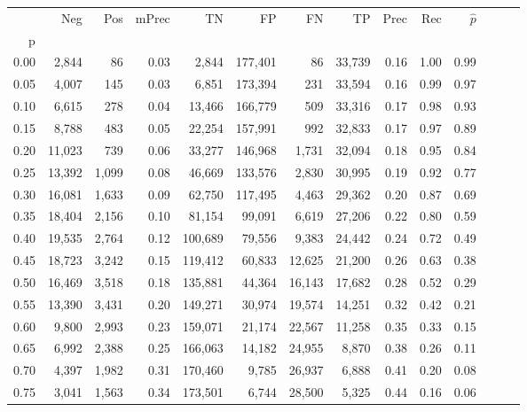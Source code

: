 \begin{tabular}{rrrrrrrrrrrrrr}
\toprule
{} &     Neg &    Pos & mPrec &       TN &       FP &      FN &      TP &  Prec &   Rec & $\hat{p}$ \\
p    &         &        &       &          &          &         &         &       &       &           \\
\midrule
0.00 &   2,844 &     86 &  0.03 &    2,844 &  177,401 &      86 &  33,739 &  0.16 &  1.00 &      0.99 \\
0.05 &   4,007 &    145 &  0.03 &    6,851 &  173,394 &     231 &  33,594 &  0.16 &  0.99 &      0.97 \\
0.10 &   6,615 &    278 &  0.04 &   13,466 &  166,779 &     509 &  33,316 &  0.17 &  0.98 &      0.93 \\
0.15 &   8,788 &    483 &  0.05 &   22,254 &  157,991 &     992 &  32,833 &  0.17 &  0.97 &      0.89 \\
0.20 &  11,023 &    739 &  0.06 &   33,277 &  146,968 &   1,731 &  32,094 &  0.18 &  0.95 &      0.84 \\
0.25 &  13,392 &  1,099 &  0.08 &   46,669 &  133,576 &   2,830 &  30,995 &  0.19 &  0.92 &      0.77 \\
0.30 &  16,081 &  1,633 &  0.09 &   62,750 &  117,495 &   4,463 &  29,362 &  0.20 &  0.87 &      0.69 \\
0.35 &  18,404 &  2,156 &  0.10 &   81,154 &   99,091 &   6,619 &  27,206 &  0.22 &  0.80 &      0.59 \\
0.40 &  19,535 &  2,764 &  0.12 &  100,689 &   79,556 &   9,383 &  24,442 &  0.24 &  0.72 &      0.49 \\
0.45 &  18,723 &  3,242 &  0.15 &  119,412 &   60,833 &  12,625 &  21,200 &  0.26 &  0.63 &      0.38 \\
0.50 &  16,469 &  3,518 &  0.18 &  135,881 &   44,364 &  16,143 &  17,682 &  0.28 &  0.52 &      0.29 \\
0.55 &  13,390 &  3,431 &  0.20 &  149,271 &   30,974 &  19,574 &  14,251 &  0.32 &  0.42 &      0.21 \\
0.60 &   9,800 &  2,993 &  0.23 &  159,071 &   21,174 &  22,567 &  11,258 &  0.35 &  0.33 &      0.15 \\
0.65 &   6,992 &  2,388 &  0.25 &  166,063 &   14,182 &  24,955 &   8,870 &  0.38 &  0.26 &      0.11 \\
0.70 &   4,397 &  1,982 &  0.31 &  170,460 &    9,785 &  26,937 &   6,888 &  0.41 &  0.20 &      0.08 \\
0.75 &   3,041 &  1,563 &  0.34 &  173,501 &    6,744 &  28,500 &   5,325 &  0.44 &  0.16 &      0.06 \\

\end{tabular}
